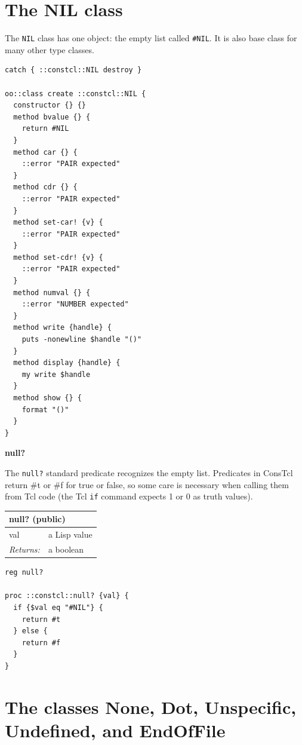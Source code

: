 \documentclass[twoside,9pt]{report}
\begin{document}
\section{The NIL class}
\label{the-nil-class}

The \texttt{NIL} class has one object: the empty list called \texttt{\#NIL}. It is also base class for many other type classes.

\noindent\makebox[\linewidth]{\rule{\linewidth}{0.4pt}}
\begin{lstlisting}
catch { ::constcl::NIL destroy }
 
oo::class create ::constcl::NIL {
  constructor {} {}
  method bvalue {} {
    return #NIL
  }
  method car {} {
    ::error "PAIR expected"
  }
  method cdr {} {
    ::error "PAIR expected"
  }
  method set-car! {v} {
    ::error "PAIR expected"
  }
  method set-cdr! {v} {
    ::error "PAIR expected"
  }
  method numval {} {
    ::error "NUMBER expected"
  }
  method write {handle} {
    puts -nonewline $handle "()"
  }
  method display {handle} {
    my write $handle
  }
  method show {} {
    format "()"
  }
}
\end{lstlisting}
\noindent\makebox[\linewidth]{\rule{\linewidth}{0.4pt}}

\textbf{null?}


The \texttt{null?} standard predicate recognizes the empty list. Predicates in ConsTcl return \#t or \#f for true or false, so some care is necessary when calling them from Tcl code (the Tcl \texttt{if} command expects 1 or 0 as truth values).

\begin{tabular}{ |l l| }
\hline
\multicolumn{2}{|l|}{null? (public)} \\
\hline
val & a Lisp value \\
\textit{Returns:} & a boolean \\
\hline
\end{tabular}

\noindent\makebox[\linewidth]{\rule{\linewidth}{0.4pt}}
\begin{lstlisting}
reg null?
 
proc ::constcl::null? {val} {
  if {$val eq "#NIL"} {
    return #t
  } else {
    return #f
  }
}
\end{lstlisting}
\noindent\makebox[\linewidth]{\rule{\linewidth}{0.4pt}}
\section{The classes None, Dot, Unspecific, Undefined, and EndOfFile}
\label{the-classes-none,-dot,-unspecific,-undefined,-and-endoffile}
\end{document}
